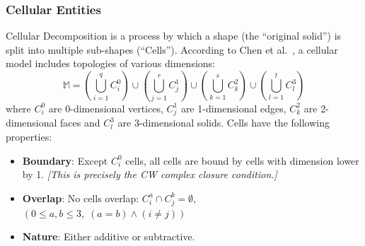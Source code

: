 \documentclass[11pt,a4paper]{article}
\newtheorem{lemma}[theorem]{Lemma}
\begin{document}
\subsubsection{Cellular Entities}

Cellular Decomposition is a process by which a shape (the ``original solid'')
is split into multiple sub-shapes (``Cells''). According to Chen et
al.~\cite{Chen2006}, a cellular model includes topologies of various
dimensions:
$$\mathbb{M} =
  \left(\bigcup_{i=1}^{q} C_i^0 \right) \cup
  \left(\bigcup_{j=1}^{r} C_j^1 \right) \cup
  \left(\bigcup_{k=1}^{s} C_k^2 \right) \cup
  \left(\bigcup_{l=1}^{t} C_l^3 \right)$$
where $C_i^0$ are 0-dimensional vertices, $C_j^1$ are 1-dimensional edges,
$C_k^2$ are 2-dimensional faces and $C_l^3$ are 3-dimensional solids. Cells
have the following properties:

\begin{itemize}[noitemsep,topsep=2pt,parsep=2pt,partopsep=2pt]
\item \textbf{Boundary}: Except $C_i^0$ cells, all cells are bound by cells
      with dimension lower by 1. \emph{[This is precisely the CW complex
      closure condition.]}
\item \textbf{Overlap}: No cells overlap:
      $C_i^a \cap C_j^b = \emptyset$,
      $(0 \leq a, b \leq 3,\; (a = b) \wedge (i \neq j))$
\item \textbf{Nature}: Either additive or subtractive.
\end{itemize}

%
%
\end{document}
